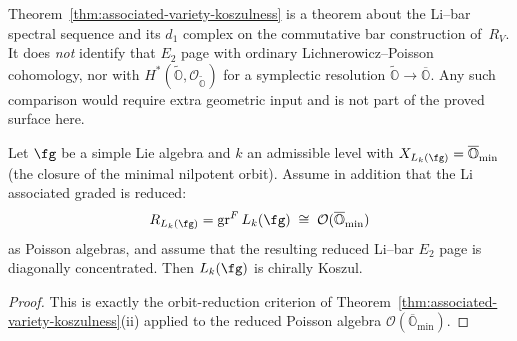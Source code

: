 \begin{remark}
\label{rem:li-bar-no-poisson-identification}

Theorem~\ref{thm:associated-variety-koszulness} is a theorem
about the Li--bar spectral sequence and its $d_1$ complex on the
commutative bar construction of~$R_V$. It does \emph{not}
identify that $E_2$ page with ordinary Lichnerowicz--Poisson
cohomology, nor with
$H^*(\widetilde{\mathbb{O}}, \mathcal{O}_{\widetilde{\mathbb{O}}})$
for a symplectic resolution
$\widetilde{\mathbb{O}} \to \overline{\mathbb{O}}$.
Any such comparison would require extra geometric input and is
not part of the proved surface here.
\end{remark}

\begin{corollary}
\label{cor:minimal-orbit-koszul}

Let $\fg$ be a simple Lie algebra and $k$ an admissible level
with $X_{L_k(\fg)} = \overline{\mathbb{O}}_{\min}$
\textup{(}the closure of the minimal nilpotent orbit\textup{)}.
Assume in addition that the Li associated graded is reduced:
\[
R_{L_k(\fg)}=\operatorname{gr}^F L_k(\fg)
\;\cong\;
\mathcal{O}(\overline{\mathbb{O}}_{\min})
\]
as Poisson algebras, and assume that the resulting reduced
Li--bar $E_2$ page is diagonally concentrated.
Then $L_k(\fg)$ is chirally Koszul.
\end{corollary}

\begin{proof}
This is exactly the orbit-reduction criterion of
Theorem~\ref{thm:associated-variety-koszulness}(ii)
applied to the reduced Poisson algebra
$\mathcal{O}(\overline{\mathbb{O}}_{\min})$.
\end{proof}

